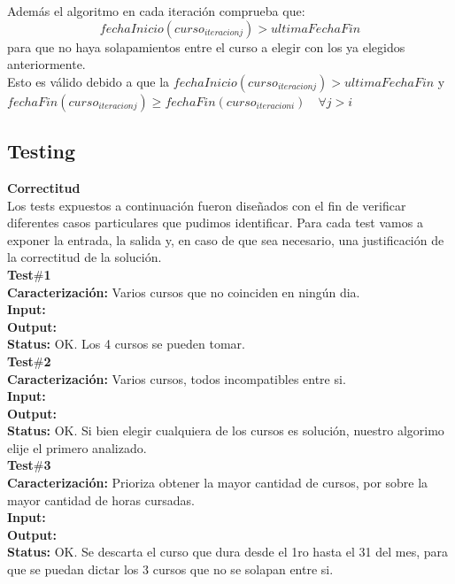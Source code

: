 Adem\'as el algoritmo en cada iteraci\'on comprueba que: 
\begin{equation}
fechaInicio(curso_{iteracionj}) > ultimaFechaFin 
\end{equation}
para que no haya solapamientos entre el curso a elegir con los ya elegidos anteriormente.\\
Esto es v\'alido debido a que la $fechaInicio(curso_{iteracionj}) > ultimaFechaFin $ y\\
$fechaFin(curso_{iteracionj}) \geq fechaFin(curso_{iteracioni}) \quad \forall j>i$\\

\newpage
\subsection{Testing}
\textbf{Correctitud}\\
Los tests expuestos a continuación fueron diseñados con el fin de verificar diferentes casos particulares que pudimos identificar. Para cada test vamos a exponer la entrada, la salida y, en caso de que sea necesario, una justificaci\'on de la correctitud de la soluci\'on.\\

\noindent\textbf{Test$\#$1}\\
\textbf{Caracterización:} Varios cursos que no coinciden en ningún dia.\\
\textbf{Input:} \\
\textbf{Output:} \\
\textbf{Status:} OK. Los 4 cursos se pueden tomar.\\

\noindent\textbf{Test$\#$2}\\
\textbf{Caracterización:} Varios cursos, todos incompatibles entre si.\\
\textbf{Input:} \\
\textbf{Output:} \\
\textbf{Status:} OK. Si bien elegir cualquiera de los cursos es solución, nuestro algorimo elije el primero analizado.\\

\noindent\textbf{Test$\#$3}\\
\textbf{Caracterización:} Prioriza obtener la mayor cantidad de cursos, por sobre la mayor cantidad de horas cursadas.\\
\textbf{Input:} \\
\textbf{Output:} \\
\textbf{Status:} OK. Se descarta el curso que dura desde el 1ro hasta el 31 del mes, para que se puedan dictar los 3 cursos que no se solapan entre si.\\

